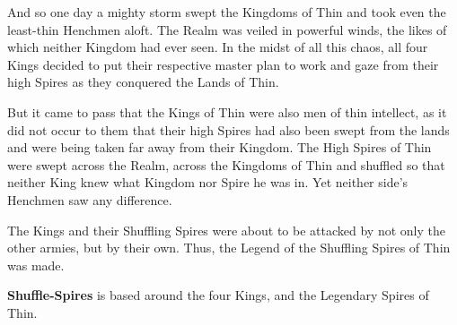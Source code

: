And so one day a mighty storm swept the Kingdoms of Thin and took even the least-thin Henchmen aloft.
The Realm was veiled in powerful winds, the likes of which neither Kingdom had ever seen. In the midst of all this chaos, all four Kings decided to put their respective master plan to work and gaze from their high Spires as they conquered the Lands of Thin.

But it came to pass that the Kings of Thin were also men of thin intellect, as it did not occur to them that their high Spires had also been swept from the lands and were being taken far away from their Kingdom. The High Spires of Thin were swept across the Realm, across the Kingdoms of Thin and shuffled so that neither King knew what Kingdom nor Spire he was in.
Yet neither side's Henchmen saw any difference.

The Kings and their Shuffling Spires were about to be attacked by not only the other armies, but by their own.
Thus, the Legend of the Shuffling Spires of Thin was made.

\textbf{Shuffle-Spires} is based around the four Kings, and the Legendary Spires of Thin.